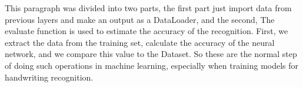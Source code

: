 \documentclass[12pt]{article}
\begin{document}
This paragraph was divided into two parts, the first part just import data from previous layers and make an output as a DataLoader, and the second, The evaluate function is used to estimate the accuracy of the recognition. First, we extract the data from the training set, calculate the accuracy of the neural network, and we compare this value to the Dataset. So these are the normal step of doing such operations in machine learning, especially when training models for handwriting recognition. 



\cite{824821}
\cite{NIPS2008_66368270}
\cite{6981034}
\end{document}
